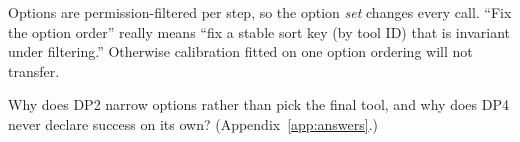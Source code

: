 \begin{pitfall}
Options are permission-filtered per step, so the option \emph{set} changes every call.
``Fix the option order'' really means ``fix a stable sort key (by tool ID) that is invariant
under filtering.'' Otherwise calibration fitted on one option ordering will not transfer.
\end{pitfall}

\begin{checkbox}
Why does DP2 narrow options rather than pick the final tool, and why does DP4 never declare
success on its own? (Appendix~\ref{app:answers}.)
\end{checkbox}
